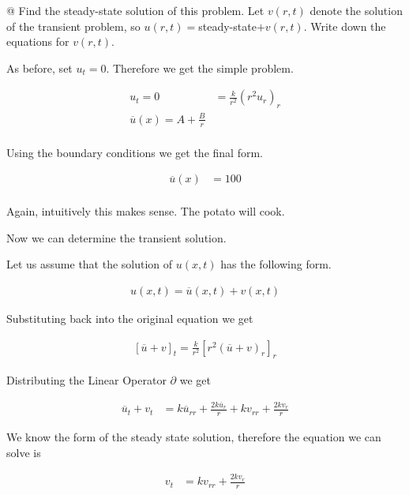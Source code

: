 \documentclass[10pt]{article}
\begin{document}
    \begin{easylist}[enumerate]
    @ Find the steady-state solution of this problem.  Let $v(r, t)$ denote the solution of the transient problem, so
    $u(r, t) = $steady-state$+ v(r, t)$. Write down the equations for $v(r, t)$.

    As before, set $u_t = 0$. Therefore we get the simple problem.

    \begin{align*}
        u_t = 0 &= \frac{k}{r^2} {(r^2u_r)}_r\\
        \overline{u}(x) = A + \frac{B}{r}\\
    \end{align*}

    Using the boundary conditions we get the final form.

    \begin{align*}
        \overline{u}(x) &= 100\\
    \end{align*}

    Again, intuitively this makes sense. The potato will cook.

    Now we can determine the transient solution.

    Let us assume that the solution of $u(x, t)$ has the following form.

    \begin{align*}
        u(x, t) = \overline{u}(x, t) + v(x, t)
    \end{align*}

    Substituting back into the original equation we get

    \begin{align*}
        {[\overline{u} + v]}_t = \frac{k}{r^2} {[r^2 (\overline{u} + v)_r]}_r
    \end{align*}

    Distributing the Linear Operator $\partial$ we get

    \begin{align*}
        \overline{u}_t + v_t &= k\overline{u}_{rr} + \frac{2k\overline{u}_r}{r} + kv_{rr} + \frac{2kv_r}{r}
    \end{align*}

    We know the form of the steady state solution, therefore the equation we can solve is 

    \begin{align*}
        v_t &= kv_{rr} + \frac{2kv_r}{r}
    \end{align*}


\end{easylist}
\end{document}
